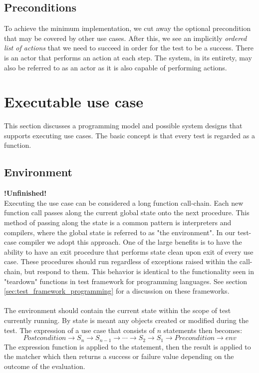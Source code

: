 \subsection{Preconditions}

To achieve the minimum implementation, we cut away the optional precondition that may be covered by other use cases. After this, we see an implicitly \emph{ordered list of actions} that we need to succeed in order for the test to be a success. There is an actor that performs an action at each step. The system, in its entirety, may also be referred to as an actor as it is also capable of performing actions.


\section{Executable use case}
This section discusses a programming model and possible system designs that supports executing use cases. The basic concept is that every test is regarded as a function.

\subsection{Environment}
\textbf{!Unfinished!}\\
Executing the use case can be considered a long function call-chain. Each new function call passes along the current global state onto the next procedure. This method of passing along the state is a common pattern is interpreters and compilers, where the global state is referred to as "the environment". In our test-case compiler we adopt this approach. One of the large benefits is to have the ability to have an exit procedure that performs state clean upon exit of every use case. These procedures should run regardless of exceptions raised within the call-chain, but respond to them. This behavior is identical to the functionality seen in "teardown" functions in test framework for programming languages. See section \ref{sec:test_framework_programming} for a discussion on these frameworks.\\\\
The environment should contain the current state within the scope of test currently running. By state is meant any objects created or modified during the test.
The expression of a use case that consists of $n$ statements then becomes: 
\begin{equation}
Postcondition \rightarrow S_n \rightarrow S_{n-1} \rightarrow \dotsb \rightarrow S_2 \rightarrow S_1 \rightarrow Precondition \rightarrow env
\end{equation}
The expression function is applied to the statement, then the result is applied to the matcher which then returns a success or failure value depending on the outcome of the evaluation.


